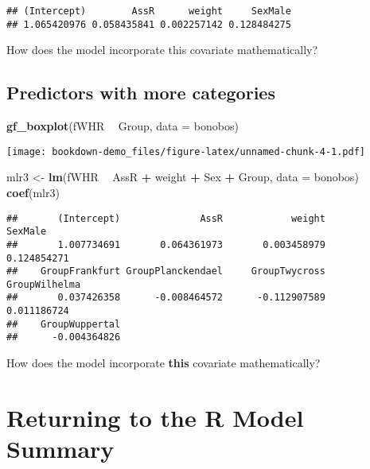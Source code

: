 \documentclass[]{book}
\newenvironment{Shaded}{\begin{snugshade}}{\end{snugshade}}
\newcommand{\DataTypeTok}[1]{\textcolor[rgb]{0.13,0.29,0.53}{#1}}
\newcommand{\KeywordTok}[1]{\textcolor[rgb]{0.13,0.29,0.53}{\textbf{#1}}}
\newcommand{\NormalTok}[1]{#1}
\newcommand{\OperatorTok}[1]{\textcolor[rgb]{0.81,0.36,0.00}{\textbf{#1}}}
\newcommand{\StringTok}[1]{\textcolor[rgb]{0.31,0.60,0.02}{#1}}
\begin{document}
\begin{verbatim}
## (Intercept)        AssR      weight     SexMale 
## 1.065420976 0.058435841 0.002257142 0.128484275
\end{verbatim}

How does the model incorporate this covariate mathematically?

\hypertarget{predictors-with-more-categories}{%
\subsection{Predictors with more categories}\label{predictors-with-more-categories}}

\begin{Shaded}
\begin{Highlighting}[]
\KeywordTok{gf_boxplot}\NormalTok{(fWHR }\OperatorTok{~}\StringTok{ }\NormalTok{Group, }\DataTypeTok{data =}\NormalTok{ bonobos)}
\end{Highlighting}
\end{Shaded}

\texttt{[image: bookdown-demo\_files/figure-latex/unnamed-chunk-4-1.pdf]}

\begin{Shaded}
\begin{Highlighting}[]
\NormalTok{mlr3 <-}\StringTok{ }\KeywordTok{lm}\NormalTok{(fWHR }\OperatorTok{~}\StringTok{ }\NormalTok{AssR }\OperatorTok{+}\StringTok{ }\NormalTok{weight }\OperatorTok{+}\StringTok{ }\NormalTok{Sex }\OperatorTok{+}\StringTok{ }\NormalTok{Group, }\DataTypeTok{data =}\NormalTok{ bonobos)}
\KeywordTok{coef}\NormalTok{(mlr3)}
\end{Highlighting}
\end{Shaded}

\begin{verbatim}
##       (Intercept)              AssR            weight           SexMale 
##       1.007734691       0.064361973       0.003458979       0.124854271 
##    GroupFrankfurt GroupPlanckendael     GroupTwycross     GroupWilhelma 
##       0.037426358      -0.008464572      -0.112907589       0.011186724 
##    GroupWuppertal 
##      -0.004364826
\end{verbatim}

How does the model incorporate \textbf{this} covariate mathematically?

\hypertarget{returning-to-the-r-model-summary}{%
\section{Returning to the R Model Summary}\label{returning-to-the-r-model-summary}}
\end{document}
